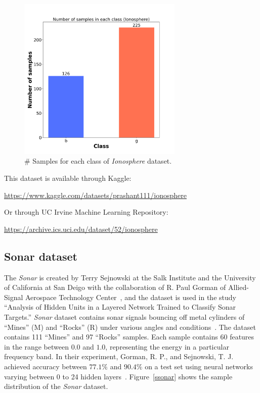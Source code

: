 \begin{figure}[H]
    \centering
    \includegraphics[width=0.7\textwidth]{images/sample/ionosphere.png}
    \caption{\# Samples for each class of \textit{Ionosphere} dataset.}
    \label{sion}
\end{figure}
\vspace{10pt}

\noindent This dataset is available through Kaggle:

\noindent \url{https://www.kaggle.com/datasets/prashant111/ionosphere}
\vspace{10pt}

\noindent Or through UC Irvine Machine Learning Repository:

\noindent \url{https://archive.ics.uci.edu/dataset/52/ionosphere}


\subsection{Sonar dataset}

The \textit{Sonar} is created by Terry Sejnowski at the Salk Institute and the University of California at San Deigo with the collaboration of R. Paul Gorman of Allied-Signal Aerospace Technology Center~\cite{sonar}, and the dataset is used in the study “Analysis of Hidden Units in a Layered Network Trained to Classify Sonar Targets.” \textit{Sonar} dataset contains sonar signals bouncing off metal cylinders of “Mines” (M) and “Rocks” (R) under various angles and conditions~\cite{sonar}. The dataset contains 111 “Mines” and 97 “Rocks” samples. Each sample contains 60 features in the range between $0.0$ and $1.0$, representing the energy in a particular frequency band. In their experiment, Gorman, R. P., and Sejnowski, T. J. achieved accuracy between $77.1\%$ and $90.4\%$ on a test set using neural networks varying between 0 to 24 hidden layers~\cite{sonar}. Figure~\ref{ssonar} shows the sample distribution of the \textit{Sonar} dataset.

